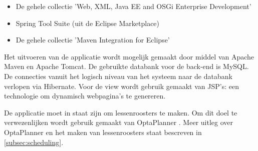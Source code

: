 \begin{itemize}
	\item De gehele collectie 'Web, XML, Java EE and OSGi Enterprise Development'	
	\item Spring Tool Suite (uit de Eclipse Marketplace)
	\item De gehele collectie 'Maven Integration for Eclipse'
\end{itemize}
\noindent
Het uitvoeren van de applicatie wordt mogelijk gemaakt door middel van Apache Maven\cite{Maven} en Apache Tomcat\cite{Tomcat}.
De gebruikte databank voor de back-end is MySQL.
De connecties vanuit het logisch niveau van het systeem naar de databank verlopen via Hibernate\cite{hibernate}. 
Voor de view wordt gebruik gemaakt van JSP's: een technologie om dynamisch webpagina's te genereren.

De applicatie moet in staat zijn om lessenroosters te maken.
Om dit doel te verwezenlijken wordt gebruik gemaakt van OptaPlanner \cite{optaplanner}. 
Meer uitleg over OptaPlanner en het maken van lessenroosters staat bescreven in \ref{subsec:scheduling}.